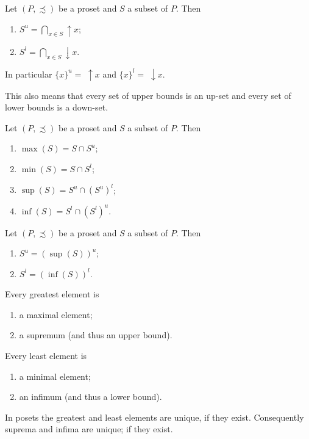 \begin{lemma}
Let $(P,\precsim)$ be a proset and $S$ a subset of $P$. Then
\begin{enumerate}
\item $S^u = \bigcap_{x\in S}\uparrow x$;
\item $S^l = \bigcap_{x\in S}\downarrow x$.
\end{enumerate}
In particular $\{x\}^u = \;\uparrow x$ and $\{x\}^l = \;\downarrow x$.
\end{lemma}
This also means that every set of upper bounds is an up-set and every set of lower bounds is a down-set.

\begin{lemma}
Let $(P,\precsim)$ be a proset and $S$ a subset of $P$. Then
\begin{enumerate}
\item $\max(S) = S\cap S^u$;
\item $\min(S) = S\cap S^l$;
\item $\sup(S) = S^u\cap (S^u)^l$;
\item $\inf(S) = S^l\cap (S^l)^u$.
\end{enumerate}
\end{lemma}

\begin{lemma}
Let $(P,\precsim)$ be a proset and $S$ a subset of $P$. Then
\begin{enumerate}
\item $S^u = (\sup(S))^u$;
\item $S^l = (\inf(S))^l$.
\end{enumerate}
\end{lemma}

\begin{lemma}
Every greatest element is
\begin{enumerate}
\item a maximal element;
\item a supremum (and thus an upper bound).
\end{enumerate}
Every least element is
\begin{enumerate}
\item a minimal element;
\item an infimum (and thus a lower bound).
\end{enumerate}
\end{lemma}

\begin{lemma}
In posets the greatest and least elements are unique, if they exist. Consequently suprema and infima are unique; if they exist.
\end{lemma}

